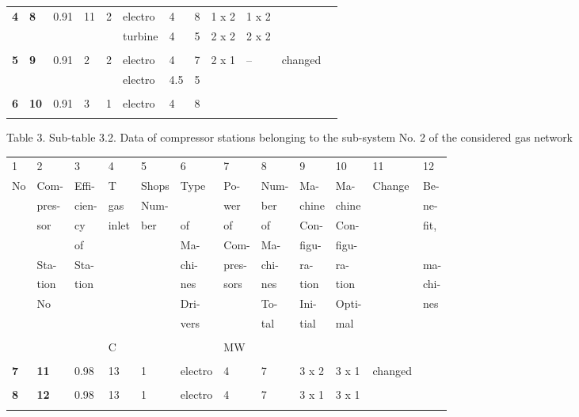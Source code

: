 \documentclass{article}
\begin{document}
\begin{tabular}{llllllllllll}
\textbf{4} & \textbf{8} & 0.91 & 11 & 2 & electro & 4 & 8 & 1 x 2 & 1 x 2 & 
&  \\ 
&  &  &  &  & turbine & 4 & 5 & 2 x 2 & 2 x 2 &  &  \\ 
&  &  &  &  &  &  &  &  &  &  &  \\ 
\textbf{5} & \textbf{9} & 0.91 & 2 & 2 & electro & 4 & 7 & 2 x 1 & -- & 
changed &  \\ 
&  &  &  &  & electro & 4.5 & 5 &  &  &  &  \\ 
&  &  &  &  &  &  &  &  &  &  &  \\ 
\textbf{6} & \textbf{10} & 0.91 & 3 & 1 & electro & 4 & 8 &  &  &  &  \\ 
&  &  &  &  &  &  &  &  &  &  & 
\end{tabular}

\bigskip


\bigskip

\newpage

\bigskip

Table 3. Sub-table 3.2. Data of compressor stations belonging to the
sub-system No. 2 of the considered gas network

\bigskip

\begin{tabular}{llllllllllll}
1 & 2 & 3 & 4 & 5 & 6 & 7 & 8 & 9 & 10 & 11 & 12 \\ 
No & Com- & Effi- & T & Shops & Type & Po- & Num- & Ma- & Ma- & Change & Be-
\\ 
& pres- & cien- & gas & Num- &  & wer & ber & chine & chine &  & ne- \\ 
& sor & cy & inlet & ber & of & of & of & Con- & Con- &  & fit, \\ 
&  & of &  &  & Ma- & Com- & Ma- & figu- & figu- &  &  \\ 
& Sta- & Sta- &  &  & chi- & pres- & chi- & ra- & ra- &  & ma- \\ 
& tion & tion &  &  & nes & sors & nes & tion & tion &  & chi- \\ 
& No &  &  &  & Dri- &  & To- & Ini- & Opti- &  & nes \\ 
&  &  &  &  & vers &  & tal & tial & mal &  &  \\ 
&  &  &  &  &  &  &  &  &  &  &  \\ 
&  &  & C &  &  & MW &  &  &  &  &  \\ 
&  &  &  &  &  &  &  &  &  &  &  \\ 
\textbf{7} & \textbf{11} & 0.98 & 13 & 1 & electro & 4 & 7 & 3 x 2 & 3 x 1 & 
changed &  \\ 
&  &  &  &  &  &  &  &  &  &  &  \\ 
\textbf{8} & \textbf{12} & 0.98 & 13 & 1 & electro & 4 & 7 & 3 x 1 & 3 x 1 & 
&  \\ 
&  &  &  &  &  &  &  &  &  &  & 
\end{tabular}
\end{document}
